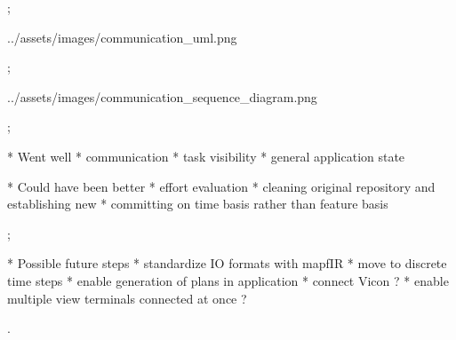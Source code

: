 \pg;



\centerline{\picw=16cm \inspic ../assets/images/communication_uml.png }

\pg;



\centerline{\picw=16cm \inspic ../assets/images/communication_sequence_diagram.png }

\pg;



* Went well
\typosize[14/14]
\begitems
* communication
* task visibility
* general application state
\enditems

* Could have been better
\typosize[14/14]
\begitems
* effort evaluation
* cleaning original repository and establishing new
* committing on time basis rather than feature basis
\enditems

\pg;



* Possible future steps
\typosize[14/14]
\begitems
* standardize IO formats with mapfIR
* move to discrete time steps
* enable generation of plans in application
* connect Vicon ?
* enable multiple view terminals connected at once ?
\enditems

\pg.
